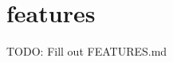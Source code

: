 \chapter{features }
\hypertarget{md__docs_2_compiler_services_2features}{}\label{md__docs_2_compiler_services_2features}
TODO\+: Fill out FEATURES.\+md 